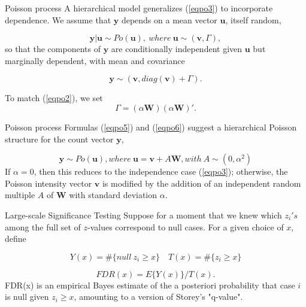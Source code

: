 \documentclass{beamer}
\begin{document}
\begin{frame}[t]{Poisson process}\vspace{10pt}
A hierarchical model generalizes (\ref{eqpo3}) to incorporate dependence. We assume that $\boldsymbol{y}$ depends on a mean vector $\boldsymbol{u}$, itself random,

\begin{equation}\label{eqpo4}
\boldsymbol{y}|\boldsymbol{u} \sim Po(\boldsymbol{u}), \ where \  \boldsymbol{u}\sim (\boldsymbol{v}, \Gamma),
\end{equation}
so that the components of $\boldsymbol{y}$ are conditionally independent given
$\boldsymbol{u}$ but marginally dependent, with mean and covariance

\begin{equation}\label{eqpo5}
\boldsymbol{y}\sim (\boldsymbol{v}, diag(\boldsymbol{v})+\Gamma).
\end{equation}

To match (\ref{eqpo2}), we set
\begin{equation}\label{eqpo6}
\Gamma = (\alpha\boldsymbol{W})(\alpha\boldsymbol{W})'.
\end{equation}

\end{frame}


\begin{frame}[t]{Poisson process}\vspace{10pt}
Formulas (\ref{eqpo5}) and (\ref{eqpo6}) suggest a hierarchical Poisson structure for the count vector $\boldsymbol{y}$,

\begin{equation}\label{eqpo7}
\boldsymbol{y}\sim Po(\boldsymbol{u}), where \ \boldsymbol{u} = \boldsymbol{v} + A\boldsymbol{W}, with \ A \sim(0,\alpha^2)
\end{equation}
If $\alpha = 0$, then this reduces to the independence case (\ref{eqpo3}); otherwise, the Poisson intensity vector $\boldsymbol{v}$ is modified by the addition of an independent random multiple $A$ of $\boldsymbol{W}$ with standard deviation $\alpha$.
\end{frame}


\begin{frame}[t]{Large-scale Significance Testing}\vspace{10pt}
Suppose for a moment that we knew which $z_i's$ among the full set of $z$-values correspond to null cases. For a given choice of $x$, define

\begin{equation}\label{eq20}
Y(x)= \# \{null \ z_i \geq x\} \quad T(x)= \# \{z_i \geq x\} 
\end{equation}

\begin{equation}\label{eq21}
FDR(x) = E\{Y(x)\}/T(x).
\end{equation}
FDR(x) is an empirical Bayes estimate of the a posteriori probability that case $i$ is null given $z_i \geq x$, amounting to a version of Storey's "q-value".
\end{frame}
\end{document}
